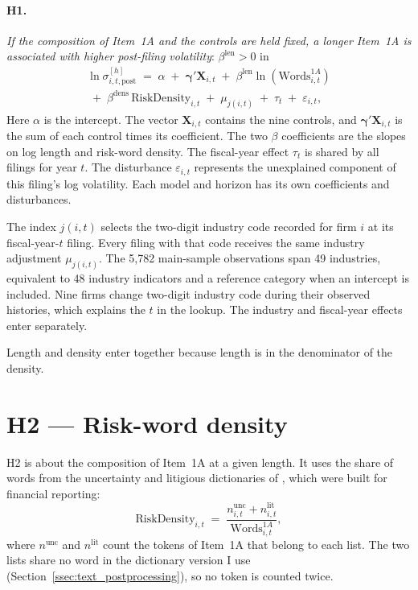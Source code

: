 \paragraph{H1.} \emph{If the composition of Item~1A and the controls are held
fixed, a longer Item~1A is associated with higher post-filing volatility}:
$\beta^{\text{len}} > 0$ in
\begin{multline}
\ln \sigma_{i,t,\mathrm{post}}^{[h]} \;=\; \alpha
\;+\; \boldsymbol{\gamma}' \mathbf{X}_{i,t}
\;+\; \beta^{\text{len}} \ln(\text{Words}^{1A}_{i,t}) \\
\;+\; \beta^{\text{dens}} \,\text{RiskDensity}_{i,t}
\;+\; \mu_{j(i,t)} \;+\; \tau_t
\;+\; \varepsilon_{i,t},
\label{eq:joint_model}
\end{multline}
Here $\alpha$ is the intercept. The vector $\mathbf{X}_{i,t}$ contains the nine controls, and $\boldsymbol{\gamma}'\mathbf{X}_{i,t}$ is the sum of each control times its coefficient. The two $\beta$ coefficients are the slopes on log length and risk-word density. The fiscal-year effect $\tau_t$ is shared by all filings for year $t$. The disturbance $\varepsilon_{i,t}$ represents the unexplained component of this filing's log volatility. Each model and horizon has its own coefficients and disturbances.

The index $j(i,t)$ selects the two-digit industry code recorded for firm $i$ at its fiscal-year-$t$ filing. Every filing with that code receives the same industry adjustment $\mu_{j(i,t)}$. The 5{,}782 main-sample observations span 49 industries, equivalent to 48 industry indicators and a reference category when an intercept is included. Nine firms change two-digit industry code during their observed histories, which explains the $t$ in the lookup. The industry and fiscal-year effects enter separately.

Length and density enter together because
length is in the denominator of the density.


\section{H2 --- Risk-word density}
\label{sec:h2}

H2 is about the composition of Item~1A at a given length. It uses the share of
words from the uncertainty and litigious dictionaries of
\textcite{loughran2011}, which were built for financial reporting:
\begin{equation}
\text{RiskDensity}_{i,t} \;=\; \frac{n^{\text{unc}}_{i,t} + n^{\text{lit}}_{i,t}}
{\text{Words}^{1A}_{i,t}},
\label{eq:risk_density}
\end{equation}
where $n^{\text{unc}}$ and $n^{\text{lit}}$ count the tokens of Item~1A that
belong to each list. The two lists share no word in the dictionary version I
use (Section~\ref{ssec:text_postprocessing}), so no token is counted twice.

